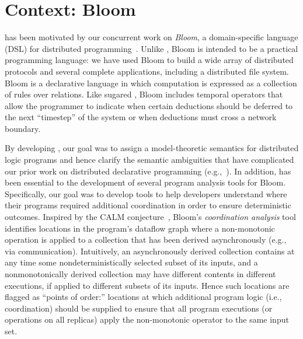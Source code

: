 \section{Context: Bloom}
\lang has been motivated by our concurrent work on \emph{Bloom}, a
domain-specific language (DSL) for distributed programming~\cite{bloom}. Unlike
\lang, Bloom is intended to be a practical programming language: we have used
Bloom to build a wide array of distributed protocols and several complete
applications, including a distributed file system. Bloom is a declarative
language in which computation is expressed as a collection of rules over
relations. Like sugared \lang, Bloom includes temporal operators that allow the
programmer to indicate when certain deductions should be deferred to the next
``timestep'' of the system or when deductions must cross a network
boundary. %

By developing \lang, our goal was to assign a model-theoretic semantics for
distributed logic programs and hence clarify the semantic ambiguities that have
complicated our prior work on distributed declarative programming
(e.g.,~\cite{Mao2009,navarro-oper-sem}). In addition, \lang has been essential
to the development of several program analysis tools for Bloom. Specifically,
our goal was to develop tools to help developers understand where their programs
required additional coordination in order to ensure deterministic
outcomes. Inspired by the CALM conjecture~\cite{cidr11,declarative-imperative},
Bloom's \emph{coordination analysis} tool identifies locations in the program's
dataflow graph where a non-monotonic operation is applied to a collection that
has been derived asynchronously (e.g., via communication).  Intuitively, an
asynchronously derived collection contains at any time some nondeterministically
selected subset of its inputs, and a nonmonotonically derived collection may
have different contents in different executions, if applied to different subsets
of its inputs.  Hence such locations are flagged as ``points of order:''
locations at which additional program logic (i.e., coordination) should be
supplied to ensure that all program executions (or operations on all replicas)
apply the non-monotonic operator to the same input set.

